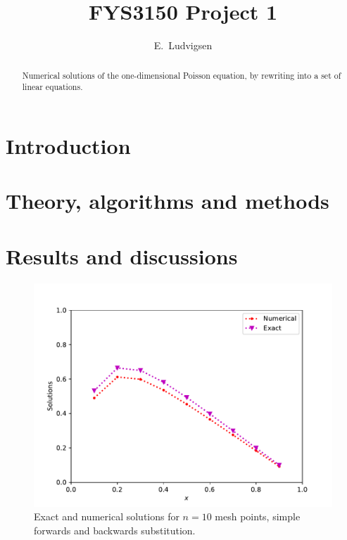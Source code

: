 \documentclass[10pt,showpacs,preprintnumbers,footinbib,amsmath,amssymb,aps,prl,twocolumn,groupedaddress,superscriptaddress,showkeys]{revtex4-1}
\begin{document}
\title{FYS3150 Project 1}
\author{E.~Ludvigsen}
\noaffiliation
\begin{abstract}
Numerical solutions of the one-dimensional Poisson equation, by rewriting into a set of linear equations. 
\end{abstract}
\maketitle


\section{Introduction}


\section{Theory, algorithms and methods}


\section{Results and discussions}


\begin{figure}[hbtp]
\includegraphics[scale=0.4]{../Output/TridiagonalSimple_out1.pdf}
\caption{Exact and numerical solutions for $n=10$ mesh points, simple forwards and backwards substitution.}
\label{fig:TridiagonalSimple_out1}
\end{figure}
\end{document}

